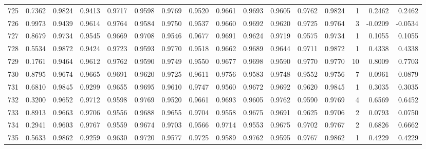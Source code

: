 \begin{tabular}{lrrrrrrrrrrrrrrr}
725 &      0.7362 &  0.9824 &  0.9413 &  0.9717 &  0.9598 &  0.9769 &  0.9520 &  0.9661 &  0.9693 &  0.9605 &   0.9762 &     0.9824 &      1 &                    0.2462 &                     0.2462 \\
726 &      0.9973 &  0.9439 &  0.9614 &  0.9764 &  0.9584 &  0.9750 &  0.9537 &  0.9660 &  0.9692 &  0.9620 &   0.9725 &     0.9764 &      3 &                   -0.0209 &                    -0.0534 \\
727 &      0.8679 &  0.9734 &  0.9545 &  0.9669 &  0.9708 &  0.9546 &  0.9677 &  0.9691 &  0.9624 &  0.9719 &   0.9575 &     0.9734 &      1 &                    0.1055 &                     0.1055 \\
728 &      0.5534 &  0.9872 &  0.9424 &  0.9723 &  0.9593 &  0.9770 &  0.9518 &  0.9662 &  0.9689 &  0.9644 &   0.9711 &     0.9872 &      1 &                    0.4338 &                     0.4338 \\
729 &      0.1761 &  0.9464 &  0.9612 &  0.9762 &  0.9590 &  0.9749 &  0.9550 &  0.9677 &  0.9698 &  0.9590 &   0.9770 &     0.9770 &     10 &                    0.8009 &                     0.7703 \\
730 &      0.8795 &  0.9674 &  0.9665 &  0.9691 &  0.9620 &  0.9725 &  0.9611 &  0.9756 &  0.9583 &  0.9748 &   0.9552 &     0.9756 &      7 &                    0.0961 &                     0.0879 \\
731 &      0.6810 &  0.9845 &  0.9299 &  0.9655 &  0.9695 &  0.9610 &  0.9747 &  0.9560 &  0.9672 &  0.9692 &   0.9620 &     0.9845 &      1 &                    0.3035 &                     0.3035 \\
732 &      0.3200 &  0.9652 &  0.9712 &  0.9598 &  0.9769 &  0.9520 &  0.9661 &  0.9693 &  0.9605 &  0.9762 &   0.9590 &     0.9769 &      4 &                    0.6569 &                     0.6452 \\
733 &      0.8913 &  0.9663 &  0.9706 &  0.9556 &  0.9688 &  0.9655 &  0.9704 &  0.9558 &  0.9675 &  0.9691 &   0.9625 &     0.9706 &      2 &                    0.0793 &                     0.0750 \\
734 &      0.2941 &  0.9603 &  0.9767 &  0.9559 &  0.9674 &  0.9703 &  0.9566 &  0.9714 &  0.9553 &  0.9675 &   0.9702 &     0.9767 &      2 &                    0.6826 &                     0.6662 \\
735 &      0.5633 &  0.9862 &  0.9259 &  0.9630 &  0.9720 &  0.9577 &  0.9725 &  0.9589 &  0.9762 &  0.9595 &   0.9767 &     0.9862 &      1 &                    0.4229 &                     0.4229 \\

\end{tabular}
